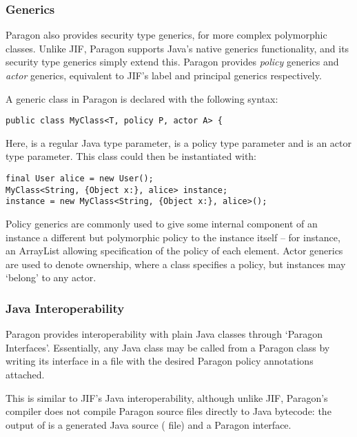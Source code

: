 \subsubsection{Generics}

Paragon also provides security type generics, for more complex polymorphic classes. Unlike JIF, Paragon supports Java's native generics functionality, and its security type generics simply extend this. Paragon provides \textit{policy} generics and \textit{actor} generics, equivalent to JIF's label and principal generics respectively.

A generic class in Paragon is declared with the following syntax:

\begin{verbatim}
public class MyClass<T, policy P, actor A> {
\end{verbatim}

Here,  is a regular Java type parameter,  is a policy type parameter and  is an actor type parameter. This class could then be instantiated with:

\begin{verbatim}
final User alice = new User();
MyClass<String, {Object x:}, alice> instance;
instance = new MyClass<String, {Object x:}, alice>();
\end{verbatim}

Policy generics are commonly used to give some internal component of an instance a different but polymorphic policy to the instance itself -- for instance, an ArrayList allowing specification of the policy of each element. Actor generics are used to denote ownership, where a class specifies a policy, but instances may `belong' to any actor.

\subsubsection{Java Interoperability}

Paragon provides interoperability with plain Java classes through `Paragon Interfaces'. Essentially, any Java class may be called from a Paragon class by writing its interface in a  file with the desired Paragon policy annotations attached.

This is similar to JIF's Java interoperability, although unlike JIF, Paragon's compiler does not compile Paragon source files directly to Java bytecode: the output of  is a generated Java source ( file) and a  Paragon interface.

